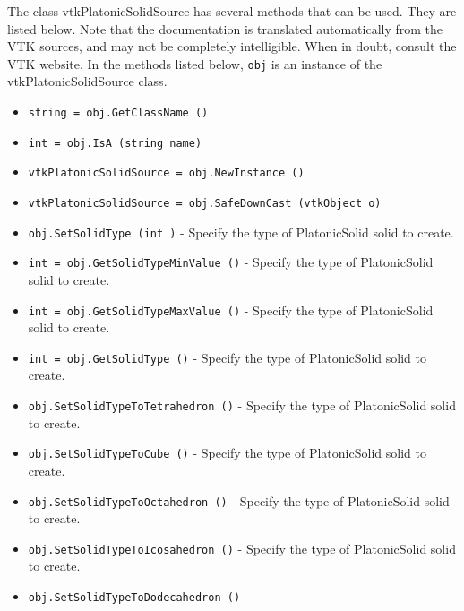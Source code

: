 The class vtkPlatonicSolidSource has several methods that can be used.
  They are listed below.
Note that the documentation is translated automatically from the VTK sources,
and may not be completely intelligible.  When in doubt, consult the VTK website.
In the methods listed below, \verb|obj| is an instance of the vtkPlatonicSolidSource class.
\begin{itemize}
\item  \verb|string = obj.GetClassName ()|

\item  \verb|int = obj.IsA (string name)|

\item  \verb|vtkPlatonicSolidSource = obj.NewInstance ()|

\item  \verb|vtkPlatonicSolidSource = obj.SafeDownCast (vtkObject o)|

\item  \verb|obj.SetSolidType (int )| -  Specify the type of PlatonicSolid solid to create.

\item  \verb|int = obj.GetSolidTypeMinValue ()| -  Specify the type of PlatonicSolid solid to create.

\item  \verb|int = obj.GetSolidTypeMaxValue ()| -  Specify the type of PlatonicSolid solid to create.

\item  \verb|int = obj.GetSolidType ()| -  Specify the type of PlatonicSolid solid to create.

\item  \verb|obj.SetSolidTypeToTetrahedron ()| -  Specify the type of PlatonicSolid solid to create.

\item  \verb|obj.SetSolidTypeToCube ()| -  Specify the type of PlatonicSolid solid to create.

\item  \verb|obj.SetSolidTypeToOctahedron ()| -  Specify the type of PlatonicSolid solid to create.

\item  \verb|obj.SetSolidTypeToIcosahedron ()| -  Specify the type of PlatonicSolid solid to create.

\item  \verb|obj.SetSolidTypeToDodecahedron ()|

\end{itemize}
